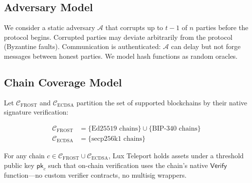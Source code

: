 \subsection{Adversary Model}

We consider a static adversary $\mathcal{A}$ that corrupts up to $t-1$ of $n$
parties before the protocol begins. Corrupted parties may deviate arbitrarily from the
protocol (Byzantine faults). Communication is authenticated: $\mathcal{A}$ can delay
but not forge messages between honest parties. We model hash functions as random
oracles.

\subsection{Chain Coverage Model}

Let $\mathcal{C}_{\text{FROST}}$ and $\mathcal{C}_{\text{ECDSA}}$ partition the set
of supported blockchains by their native signature verification:

\begin{align*}
  \mathcal{C}_{\text{FROST}} &= \{\text{Ed25519 chains}\} \cup \{\text{BIP-340 chains}\} \\
  \mathcal{C}_{\text{ECDSA}} &= \{\text{secp256k1 chains}\}
\end{align*}

For any chain $c \in \mathcal{C}_{\text{FROST}} \cup \mathcal{C}_{\text{ECDSA}}$,
Lux Teleport holds assets under a threshold public key $\mathsf{pk}_c$ such that
on-chain verification uses the chain's native $\mathsf{Verify}$ function---no custom
verifier contracts, no multisig wrappers.

